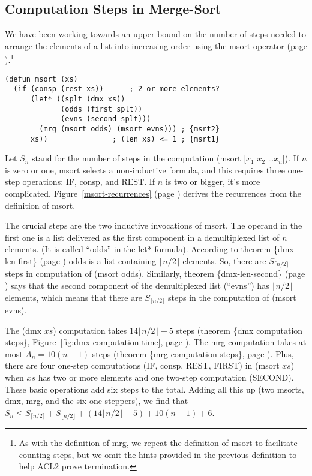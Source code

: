 \subsection{Computation Steps in Merge-Sort}
\label{subsec:msort-steps}

We have been working towards an upper bound on the number of steps
needed to arrange the elements of a list into increasing order
using the msort operator (page \pageref{defun:msort}).\footnote{As
with the definition of mrg, we repeat the definition of msort
to facilitate counting steps, but we omit the hints
provided in the previous definition to help ACL2 prove termination.}

\label{defun:msort-copy}
\begin{Verbatim}
(defun msort (xs)
  (if (consp (rest xs))      ; 2 or more elements?
      (let* ((splt (dmx xs))
             (odds (first splt))
             (evns (second splt)))
        (mrg (msort odds) (msort evns))) ; {msrt2}
      xs))               ; (len xs) <= 1 ; {msrt1}
\end{Verbatim}

Let $S_n$ stand for the number of steps in the computation
(msort [$x_1$ $x_2$ \dots $x_n$]).
If $n$ is zero or one, msort selects a non-inductive
formula, and this requires three one-step operations: IF, consp, and REST.
If $n$ is two or bigger, it's more complicated.
Figure~\ref{msort-recurrences} (page \pageref{msort-recurrences})
derives the recurrences from the definition of msort.

The crucial steps are the two inductive invocations of msort.
The operand in the first one is a list delivered as the first component in
a demultiplexed list of $n$ elements.
(It is called ``odds'' in the let* formula).
According to theorem \{dmx-len-first\} (page \pageref{thm:dmx-length-first-second})
odds is a list containing $\lceil  n/2\rceil$ elements.
So, there are $S_{\lceil n/2\rceil}$ steps in computation of (msort odds).
Similarly, theorem  \{dmx-len-second\} (page \pageref{thm:dmx-length-first-second})
says that the second component of the demultiplexed list (``evns'')
has $\lfloor n/2\rfloor$ elements, which means that there are
$S_{\lfloor n/2\rfloor}$ steps in the computation of (msort evns).

The (dmx $xs$) computation takes $14\lfloor  n/2\rfloor + 5$ steps
(theorem \{dmx computation steps\},
Figure~\ref{fig:dmx-computation-time},
page \pageref{fig:dmx-computation-time}).
The mrg computation takes at most $A_n = 10(n+1)$ steps
(theorem \{mrg computation steps\}, page \pageref{thm:mrg-steps}).
Plus, there are four one-step computations (IF, consp, REST, FIRST)
in (msort $xs$) when $xs$ has two or more elements
and one two-step computation (SECOND).
These basic operations add six steps to the total.
Adding all this up (two msorts, dmx, mrg, and the six one-steppers),
we find that
$S_n \leq S_{\lceil  n/2\rceil} + S_{\lfloor  n/2\rfloor} +
          (14\lfloor n/2\rfloor + 5) + 10(n+1) + 6$.

